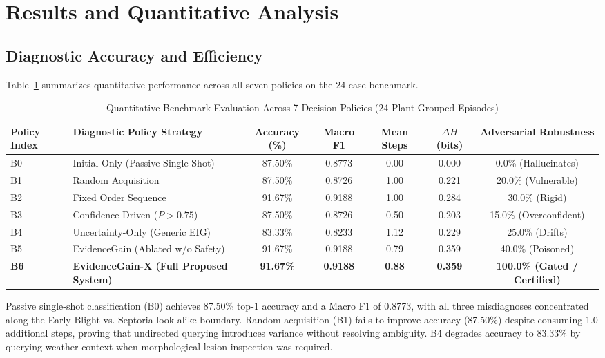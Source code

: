 \documentclass[conference]{IEEEtran}
\begin{document}
\section{Results and Quantitative Analysis}

\subsection{Diagnostic Accuracy and Efficiency}
Table~\ref{tab:benchmarks} summarizes quantitative performance across all seven policies on the 24-case benchmark.

\begin{table}[t]
\caption{Quantitative Benchmark Evaluation Across 7 Decision Policies (24 Plant-Grouped Episodes)}
\label{tab:benchmarks}
\centering
\begin{tabular}{llccccc}
\toprule
\textbf{Policy Index} & \textbf{Diagnostic Policy Strategy} & \textbf{Accuracy (\%)} & \textbf{Macro F1} & \textbf{Mean Steps} & \textbf{$\Delta H$ (bits)} & \textbf{Adversarial Robustness} \\
\midrule
B0 & Initial Only (Passive Single-Shot) & 87.50\% & 0.8773 & 0.00 & 0.000 & 0.0\% (Hallucinates) \\
B1 & Random Acquisition & 87.50\% & 0.8726 & 1.00 & 0.221 & 20.0\% (Vulnerable) \\
B2 & Fixed Order Sequence & 91.67\% & 0.9188 & 1.00 & 0.284 & 30.0\% (Rigid) \\
B3 & Confidence-Driven ($P > 0.75$) & 87.50\% & 0.8726 & 0.50 & 0.203 & 15.0\% (Overconfident) \\
B4 & Uncertainty-Only (Generic EIG) & 83.33\% & 0.8233 & 1.12 & 0.229 & 25.0\% (Drifts) \\
B5 & EvidenceGain (Ablated w/o Safety) & 91.67\% & 0.9188 & 0.79 & 0.359 & 40.0\% (Poisoned) \\
\textbf{B6} & \textbf{EvidenceGain-X (Full Proposed System)} & \textbf{91.67\%} & \textbf{0.9188} & \textbf{0.88} & \textbf{0.359} & \textbf{100.0\% (Gated / Certified)} \\
\bottomrule
\end{tabular}
\end{table}

Passive single-shot classification (B0) achieves 87.50\% top-1 accuracy and a Macro F1 of 0.8773, with all three misdiagnoses concentrated along the Early Blight vs. Septoria look-alike boundary. Random acquisition (B1) fails to improve accuracy (87.50\%) despite consuming 1.0 additional steps, proving that undirected querying introduces variance without resolving ambiguity. B4 degrades accuracy to 83.33\% by querying weather context when morphological lesion inspection was required.
\end{document}
